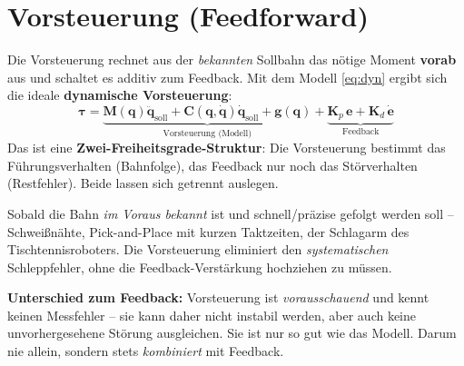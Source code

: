\section{Vorsteuerung (Feedforward)}
Die Vorsteuerung rechnet aus der \emph{bekannten} Sollbahn das nötige Moment
\textbf{vorab} aus und schaltet es additiv zum Feedback. Mit dem Modell
\eqref{eq:dyn} ergibt sich die ideale \textbf{dynamische Vorsteuerung}:
\begin{equation}\label{eq:ff}
\bm{\tau} = \underbrace{\bm{M}(\bm{q})\ddot{\bm{q}}_{\text{soll}}
+ \bm{C}(\bm{q},\dot{\bm{q}})\dot{\bm{q}}_{\text{soll}} + \bm{g}(\bm{q})}
_{\text{Vorsteuerung (Modell)}}
+ \underbrace{\bm{K}_p\,\bm{e} + \bm{K}_d\,\dot{\bm{e}}}_{\text{Feedback}}
\end{equation}
Das ist eine \textbf{Zwei-Freiheitsgrade-Struktur}: Die Vorsteuerung bestimmt
das Führungsverhalten (Bahnfolge), das Feedback nur noch das Störverhalten
(Restfehler). Beide lassen sich getrennt auslegen.
\begin{infobox}[title=Wann einsetzen]
Sobald die Bahn \emph{im Voraus bekannt} ist und schnell/präzise gefolgt werden
soll -- Schweißnähte, Pick-and-Place mit kurzen Taktzeiten, der Schlagarm des
Tischtennisroboters. Die Vorsteuerung eliminiert den \emph{systematischen}
Schleppfehler, ohne die Feedback-Verstärkung hochziehen zu müssen.
\end{infobox}
\textbf{Unterschied zum Feedback:} Vorsteuerung ist \emph{vorausschauend} und
kennt keinen Messfehler -- sie kann daher nicht instabil werden, aber auch keine
unvorhergesehene Störung ausgleichen. Sie ist nur so gut wie das Modell. Darum
nie allein, sondern stets \emph{kombiniert} mit Feedback.

